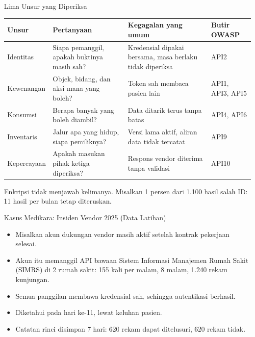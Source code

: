 \documentclass[aspectratio=169, table, 12pt]{beamer}
\begin{document}
\begin{frame}{{\Large Lima Unsur yang Diperiksa}}
  \footnotesize
  \begin{tabularx}{\textwidth}{>{\raggedright\arraybackslash}p{2.1cm}
      >{\raggedright\arraybackslash}X >{\raggedright\arraybackslash}X >{\raggedright\arraybackslash}p{1.7cm}}
    \hline
    \textbf{Unsur} & \textbf{Pertanyaan} & \textbf{Kegagalan yang umum} & \textbf{Butir OWASP} \\ \hline
    Identitas & Siapa pemanggil, apakah buktinya masih sah? & Kredensial dipakai bersama, masa berlaku tidak diperiksa & API2 \\ \hline
    Kewenangan & Objek, bidang, dan aksi mana yang boleh? & Token sah membaca pasien lain & API1, API3, API5 \\ \hline
    Konsumsi & Berapa banyak yang boleh diambil? & Data ditarik terus tanpa batas & API4, API6 \\ \hline
    Inventaris & Jalur apa yang hidup, siapa pemiliknya? & Versi lama aktif, aliran data tidak tercatat & API9 \\ \hline
    Kepercayaan & Apakah masukan pihak ketiga diperiksa? & Respons vendor diterima tanpa validasi & API10 \\ \hline
  \end{tabularx}

  \vspace{6pt}
  \small Enkripsi tidak menjawab kelimanya. Misalkan 1 persen dari 1.100 hasil salah ID: 11 hasil per bulan tetap diteruskan.
\end{frame}

\begin{frame}{{\Large Kasus Medikara: Insiden Vendor 2025 (Data Latihan)}}
  \vspace{6pt}
  \begin{itemize}
    \item Misalkan akun dukungan vendor masih aktif setelah kontrak pekerjaan selesai.
    \item Akun itu memanggil API bawaan Sistem Informasi Manajemen Rumah Sakit (SIMRS) di 2 rumah sakit: 155 kali per malam, 8 malam, 1.240 rekam kunjungan.
    \item Semua panggilan membawa kredensial sah, sehingga autentikasi berhasil.
    \item Diketahui pada hari ke-11, lewat keluhan pasien.
    \item Catatan rinci disimpan 7 hari: 620 rekam dapat ditelusuri, 620 rekam tidak.
  \end{itemize}
\end{frame}
\end{document}
